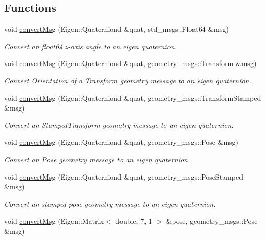 \subsection*{Functions}
\begin{DoxyCompactItemize}
\item 
void \hyperlink{group__transport__controller_ga465b07e16106af072ed5315010fa876c}{convert\+Msg} (Eigen\+::\+Quaterniond \&quat, std\+\_\+msgs\+::\+Float64 \&msg)
\begin{DoxyCompactList}\small\item\em Convert an float64 z-\/axis angle to an eigen quaternion. \end{DoxyCompactList}\item 
void \hyperlink{group__transport__controller_gad42169e0be94216cd31a8a360a848155}{convert\+Msg} (Eigen\+::\+Quaterniond \&quat, geometry\+\_\+msgs\+::\+Transform \&msg)
\begin{DoxyCompactList}\small\item\em Convert Orientation of a Transform geometry message to an eigen quaternion. \end{DoxyCompactList}\item 
void \hyperlink{group__transport__controller_ga34987bf2293cc8aa5fac7ac60e6510ef}{convert\+Msg} (Eigen\+::\+Quaterniond \&quat, geometry\+\_\+msgs\+::\+Transform\+Stamped \&msg)
\begin{DoxyCompactList}\small\item\em Convert an Stamped\+Transform geometry message to an eigen quaternion. \end{DoxyCompactList}\item 
void \hyperlink{group__transport__controller_gadc07db93efb76fd809b67b74dd13b939}{convert\+Msg} (Eigen\+::\+Quaterniond \&quat, geometry\+\_\+msgs\+::\+Pose \&msg)
\begin{DoxyCompactList}\small\item\em Convert an Pose geometry message to an eigen quaternion. \end{DoxyCompactList}\item 
void \hyperlink{group__transport__controller_ga8257db2bb94ec53eadfe87d04b38cc0b}{convert\+Msg} (Eigen\+::\+Quaterniond \&quat, geometry\+\_\+msgs\+::\+Pose\+Stamped \&msg)
\begin{DoxyCompactList}\small\item\em Convert an stamped pose geometry message to an eigen quaternion. \end{DoxyCompactList}\item 
void \hyperlink{group__transport__controller_gafde5764b46f0189c2aea14ed57434708}{convert\+Msg} (Eigen\+::\+Matrix$<$ double, 7, 1 $>$ \&pose, geometry\+\_\+msgs\+::\+Pose \&msg)

\end{DoxyCompactItemize}
